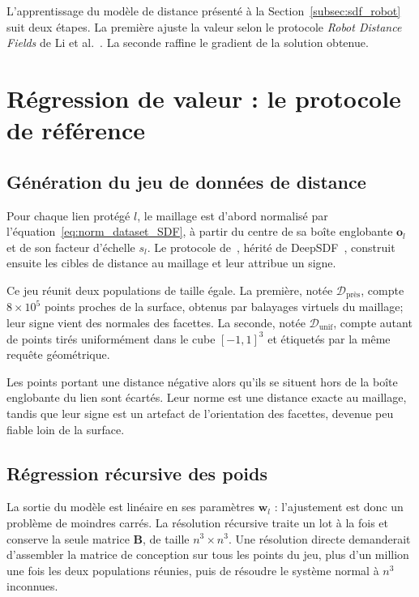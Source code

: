 \label{annexe:sdf_training}

L'apprentissage du modèle de distance présenté à la Section~\ref{subsec:sdf_robot} suit deux étapes. La première ajuste la valeur selon le protocole \textit{Robot Distance Fields} de Li et al.~\cite{Li2024rdf}. La seconde raffine le gradient de la solution obtenue.

\section*{Régression de valeur : le protocole de référence}

\subsection*{Génération du jeu de données de distance}

Pour chaque lien protégé $l$, le maillage est d'abord normalisé par l'équation~\eqref{eq:norm_dataset_SDF}, à partir du centre de sa boîte englobante $\mathbf{o}_l$ et de son facteur d'échelle $s_l$. Le protocole de~\cite{Li2024rdf}, hérité de DeepSDF~\cite{park2019deepsdf}, construit ensuite les cibles de distance au maillage et leur attribue un signe.

Ce jeu réunit deux populations de taille égale. La première, notée $\mathcal{D}_{\text{près}}$, compte $8\times10^{5}$ points proches de la surface, obtenus par balayages virtuels du maillage; leur signe vient des normales des facettes. La seconde, notée $\mathcal{D}_{\mathrm{unif}}$, compte autant de points tirés uniformément dans le cube $[-1,1]^3$ et étiquetés par la même requête géométrique.

Les points portant une distance négative alors qu'ils se situent hors de la boîte englobante du lien sont écartés. Leur norme est une distance exacte au maillage, tandis que leur signe est un artefact de l'orientation des facettes, devenue peu fiable loin de la surface.

\subsection*{Régression récursive des poids}

La sortie du modèle est linéaire en ses paramètres $\mathbf{w}_l$ : l'ajustement est donc un problème de moindres carrés. La résolution récursive traite un lot à la fois et conserve la seule matrice $\mathbf{B}$, de taille $n^3\times n^3$. Une résolution directe demanderait d'assembler la matrice de conception sur tous les points du jeu, plus d'un million une fois les deux populations réunies, puis de résoudre le système normal à $n^3$ inconnues.

